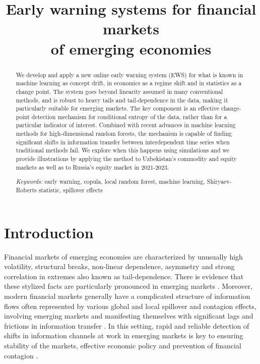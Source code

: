 
\title{Early warning systems for financial markets \\ of emerging economies }
\maketitle
\sloppy

\begin{abstract}

\noindent We develop and apply a new online early warning system (EWS) for what is known in machine learning as concept drift, in economics as a regime shift and in statistics as a change point. The system goes beyond linearity assumed in many conventional methods, and is robust to heavy tails and tail-dependence in the data, making it particularly suitable for emerging markets. The key component is an effective change-point detection mechanism for conditional entropy of the data, rather than for a particular indicator of interest. Combined with recent advances in machine learning methods for high-dimensional random forests, the mechanism is capable of finding significant shifts in information transfer between interdependent time series when traditional methods fail. We explore when this happens using simulations and we provide illustrations by applying the method to Uzbekistan's commodity and equity markets as well as to Russia's equity market in 2021-2023. 

\bigskip
\noindent\emph{Keywords:} early warning, copula, local random forest, machine learning, Shiryaev-Roberts statistic, spillover effects
\end{abstract}
\newpage

\section{Introduction}

Financial markets of emerging economies are characterized by unusually high volatility, structural breaks, non-linear dependence, asymmetry and strong correlation in extremes also known as tail-dependence. There is evidence that these stylized facts are particularly pronounced in emerging markets \cite[see, e.g.,][]{CHAUDHURI:03, Chen/ibra:19}. Moreover, modern financial markets generally have a complicated structure of information flows often represented by  various global and local spillover and contagion effects, involving emerging markets and manifesting themselves with significant lags and frictions in information transfer \cite[see, e.g.,][]{ZHAO/etal:22, KHALFAOUI/etal:23, AHMAD/etal:18}. In this setting, rapid and reliable detection of shifts in information channels at work in  emerging markets is key to ensuring stability of the markets, effective economic policy and prevention of financial contagion \cite[see, e.g.,][]{NEAIME:16, SMIMOU:15, YANG:23}.  


